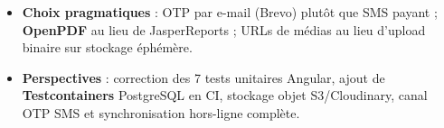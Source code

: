 \begin{itemize}
    \item \textbf{Choix pragmatiques} : OTP par e-mail (Brevo) plutôt que SMS payant ; \textbf{OpenPDF} au lieu de JasperReports ; URLs de médias au lieu d'upload binaire sur stockage éphémère.
    \item \textbf{Perspectives} : correction des 7 tests unitaires Angular, ajout de \textbf{Testcontainers} PostgreSQL en CI, stockage objet S3/Cloudinary, canal OTP SMS et synchronisation hors-ligne complète.
\end{itemize}
